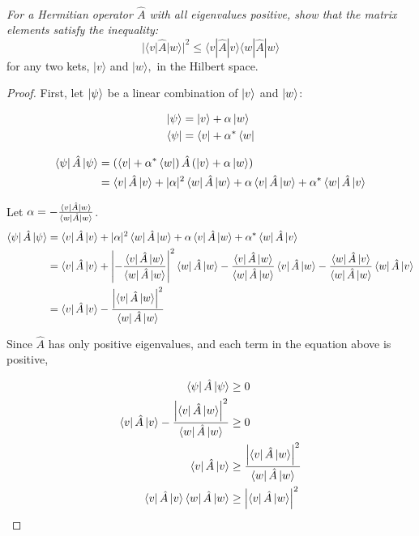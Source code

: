 \documentclass[12pt, letterpaper]{article}
\begin{document}
\subsection{}
\textit{For a Hermitian operator $\hat{A}$ with all eigenvalues positive, show that the matrix elements satisfy the inequality:}
$$
|\langle v|\hat{A}| w\rangle|^{2} \leq\langle v|\hat{A}| v\rangle\langle w|\hat{A}| w\rangle
$$ for any two kets, $|v\rangle$ and $|w\rangle,$ in the Hilbert space.
\begin{proof}
First, let $\ket{\psi}$ be a linear combination of $\ket{v}$ and $\ket{w}$:

\begin{align*}
    \ket{\psi} &= \ket{v} +\alpha \ket{w} \\
    \bra{\psi}&= \bra{v} +\alpha^* \bra{w}
\end{align*}

\begin{align*}
    \bra\psi \hat A \ket\psi&= \left(\bra{v} +\alpha^* \bra{w}\right) \hat A \left(\ket{v} +\alpha \ket{w}\right)\\
    & =\bra v\hat{A} \ket v+|\alpha|^{2} \bra w \hat{A}  \ket w + \alpha \bra  v\hat A \ket w+\alpha^{*}\bra w\hat{A} \ket v
\end{align*}

Let $\alpha = -\frac{\bra{v}\hat A \ket w}{\bra w \hat A \ket w}$.
\begin{align*}
    \bra\psi \hat A \ket\psi& =\bra v\hat{A} \ket v+|\alpha|^{2} \bra w \hat{A}  \ket w + \alpha \bra  v\hat A \ket w+\alpha^{*}\bra w\hat{A} \ket v\\
    & =\bra v\hat{A} \ket v+\left| -\frac{\bra{v}\hat A \ket w}{\bra w \hat A \ket w}\right|^{2} \bra w \hat{A}  \ket w  -\frac{\bra{v}\hat A \ket w}{\bra w \hat A \ket w} \bra  v\hat A \ket w -\frac{\bra{w}\hat A \ket v}{\bra w \hat A \ket w}\bra w\hat{A} \ket v \\
    &= \bra v\hat{A} \ket v - \frac{\left|\bra v \hat A \ket w \right|^2}{\bra w \hat A \ket w}
\end{align*}

Since $\hat A$ has only positive eigenvalues, and each term in the equation above is positive, 

\begin{align*}
     \bra\psi \hat A \ket\psi &\geq 0\\
     \bra v\hat{A} \ket v - \frac{\left|\bra v \hat A \ket w \right|^2}{\bra w \hat A \ket w} &\geq 0\\
     \bra v\hat{A} \ket v &\geq \frac{\left|\bra v \hat A \ket w \right|^2}{\bra w \hat A \ket w}\\
     \bra v\hat{A} \ket v \bra w \hat A \ket w &\geq \left|\bra v \hat A \ket w \right|^2\\
\end{align*}
\end{proof}
    
\end{document}
